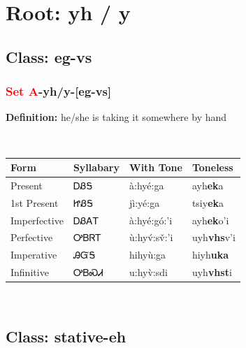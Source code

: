 \needspace{4in}
\section*{Root: yh / y}
\nopagebreak
{}
\needspace{3in}
\subsection*{Class: eg-vs}
\nopagebreak
\needspace{2in}
\subsubsection*{\textcolor{Red}{Set A}{-}\textbf{yh/y}{-}[eg-vs]}
\nopagebreak
\textbf{Definition: } he/she is taking it somewhere by hand
\\[0.5em]
\begin{tabularx}{\textwidth}{l X X X}%
\toprule%
\textbf{Form}&\textbf{Syllabary}&\textbf{With Tone}&\textbf{Toneless}\\%
\midrule%
Present&ᎠᏰᎦ&à:hyé:ga&ayh\textbf{ek}a\\%
1st Present&ᏥᏰᎦ&jì:yé:ga&tsiy\textbf{ek}a\\%
Imperfective&ᎠᏰᎪᎢ&à:hyé:gó:’i&ayh\textbf{ek}o'i\\%
Perfective&ᎤᏴᏒᎢ&ù:hyv́:sv̌:’i&uyh\textbf{vhs}v'i\\%
Imperative&ᎯᏳᎦ&hihyù:ga&hiyh\textbf{uka}\\%
Infinitive&ᎤᏴᏍᏗ&u:hyv̀:sdi&uyh\textbf{vhst}i\\%
\bottomrule%
\end{tabularx}
\\[1em]
\needspace{3in}
\subsection*{Class: stative-eh}
\nopagebreak
\needspace{2in}
